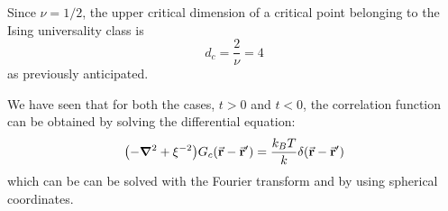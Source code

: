 \documentclass[../../Main/Main.tex]{subfiles}
\begin{document}
\begin{remark}
Since \( \nu = 1/2 \), the upper critical dimension of a critical point belonging to the Ising universality class is
\begin{equation*}
  d_c = \frac{2}{\nu } = 4
\end{equation*}
as previously anticipated.
\end{remark}

We have seen that for both the cases, \( t>0 \) and \( t<0 \),  the correlation function  can be obtained by solving the differential equation:
\begin{equation}
  \qty(- \grad ^2 + \xi ^{-2}) G_c (\va{r}-\va{r}') = \frac{k_B T}{k} \delta (\va{r}-\va{r}')
  \label{eq:17_13}
\end{equation}
which can be can be solved  with the Fourier transform and by using spherical coordinates. 
\end{document}
